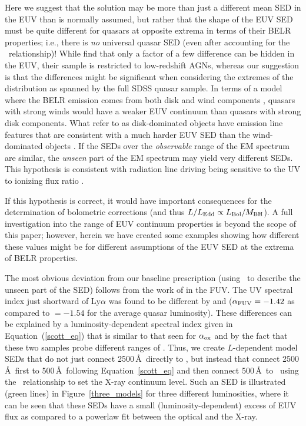 Here we suggest that the solution may be more than just a different mean SED in the EUV than is normally assumed, but rather that the shape of the EUV SED must be quite different for quasars at opposite extrema in terms of their BELR properties; i.e., there is {\em no} universal quasar SED (even after accounting for the \luvaox\ relationship)!  While \citet{Grupe:2010} find that only a factor of a few difference can be hidden in the EUV, their sample is restricted to low-redshift AGNs, whereas our suggestion is that the differences might be significant when considering the extremes of the distribution as spanned by the full SDSS quasar sample.  
In terms of a model where the BELR emission comes from both disk and wind components \citep{Collin-Souffrin:1988,Leighly:2004}, quasars with strong winds would have a weaker EUV continuum than quasars with strong disk components.  
What \citet{Richards:2011} refer to as disk-dominated objects have emission line features that are consistent with a much harder EUV SED than the wind-dominated objects \citep{Kruczek:2011}.  If the SEDs over the {\em observable} range of the EM spectrum are similar, the {\em unseen} part of the EM spectrum may yield very different SEDs. This hypothesis is consistent with radiation line driving being sensitive to the UV to ionizing flux ratio \citep{Proga:2000}.

If this hypothesis is correct, it would have important consequences for the determination of bolometric corrections (and thus $L/L_{\rm Edd} \propto L_{\rm Bol}/M_{\rm BH}$).  A full investigation into the range of EUV continuum properties is beyond the scope of this paper; however, herein we have created some examples showing how different these values might be for different assumptions of the EUV SED at the extrema of BELR properties.  

The most obvious deviation from our baseline prescription (using \luvaox\ to describe the unseen part of the SED) follows from the work of \citet{Scott:2004}
in the FUV.  The UV spectral index just shortward of Ly$\alpha$ was found to be different by \citet{Telfer:2002} and \citet{Scott:2004} ($\alpha_{{\rm FUV}}=-1.42$ as compared to \aox$=-1.54$ for the average quasar luminosity).  These differences can be explained by a luminosity-dependent spectral index given in Equation~(\ref{scott_eq}) \citep{Scott:2004} that is similar to that seen for $\alpha_{\rm ox}$ and by the fact that these two samples probe different ranges of \luv.   Thus, we create $L$-dependent model SEDs that do not just connect 2500\,\AA\ directly to \hundredev, but instead that connect 2500\,\AA\ first to 500\,\AA\ following Equation~\ref{scott_eq} and then connect 500\,\AA\ to \twohundredev\ using the \luvaox\ relationship to set the X-ray continuum level.  Such an SED is illustrated (green lines) in Figure~\ref{three_models} for three different luminosities, where it can be seen that these SEDs 
have a small (luminosity-dependent) excess of EUV flux as compared to a powerlaw fit between the optical and the X-ray.

